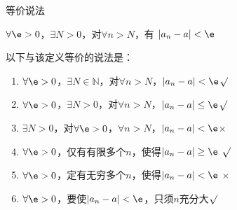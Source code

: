 
\begin{frame}{等价说法}
	\linespread{1.2}
	\begin{center}
		\alert{$\forall\e>0$，$\exists N>0$，对$\forall n>N$，有
		$|a_n-a|<\e$}
	\end{center}\pause 
	以下与该定义等价的说法是：\pause  
	\begin{enumerate}
	  \item $\forall\e>0$，$\exists N\in\mathbb{N}$，对$\forall
	  n>N$，$|a_n-a|<\e$\pause \hfill\alert{$\surd$}\pause 
	  \item $\forall\e>0$，$\exists N>0$，对$\forall
	  n>N$，$|a_n-a|\leq\e$\pause \hfill\alert{$\surd$}\pause 
	  \item $\exists N>0$，对$\forall\e>0$，$\forall
	  n>N$，$|a_n-a|<\e$\pause \hfill\alert{$\times$}\pause 
	  \item $\forall\e>0$，仅有有限多个$n$，使得$|a_n-a|\geq\e$\pause
	  \hfill\alert{$\surd$}\pause 
	  \item $\forall\e>0$，定有无穷多个$n$，使得$|a_n-a|<\e$\pause
	  \hfill\alert{$\times$}\pause 
	  \item $\forall\e>0$，要使$|a_n-a|<\e$，只须$n$充分大\pause \hfill\alert{$\surd$}
	\end{enumerate}
\end{frame}

